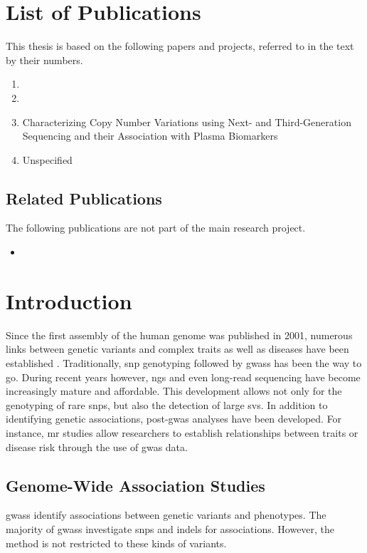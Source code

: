 \documentclass[draft, twoside=false]{scrbook}
\begin{document}
\chapter{List of Publications}
This thesis is based on the following papers and projects, referred to in the text by their numbers.

\begin{enumerate}[label=\Roman*.]
    \item {}
    \item {}
    \item Characterizing Copy Number Variations using Next- and Third-Generation Sequencing and their Association with Plasma Biomarkers
    \item Unspecified
\end{enumerate}

\section*{Related Publications}
The following publications are not part of the main research project.
\begin{itemize}
    \item {}
\end{itemize}

\tableofcontents

\mainmatter
\glsresetall
\parskip 0pt
\parindent \oldparindent
\chapter{Introduction}
Since the first assembly of the human genome was published in 2001, numerous links between genetic variants and complex traits as well as diseases have been established \cite{Lander2001}.
Traditionally, \gls{snp} genotyping followed by \glspl{gwas} has been the way to go.
During recent years however, \gls{ngs} and even long-read sequencing have become increasingly mature and affordable.
This development allows not only for the genotyping of rare \glspl{snp}, but also the detection of large \glspl{sv}.
In addition to identifying genetic associations, post-\gls{gwas} analyses have been developed.
For instance, \gls{mr} studies allow researchers to establish relationships between traits or disease risk through the use of \gls{gwas} data.

\section{Genome-Wide Association Studies}
\Glspl{gwas} identify associations between genetic variants and phenotypes.
The majority of \glspl{gwas} investigate \glspl{snp} and \glspl{indel} for associations.
However, the method is not restricted to these kinds of variants.
\end{document}
